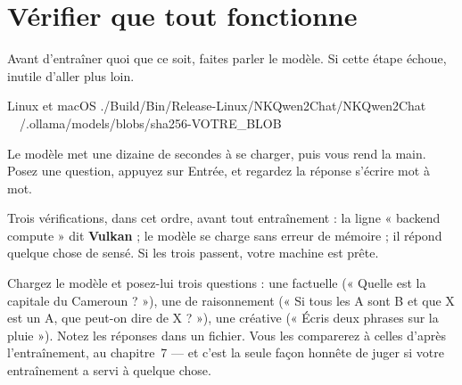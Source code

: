 \section{Vérifier que tout fonctionne}

Avant d'entraîner quoi que ce soit, faites parler le modèle. Si cette étape
échoue, inutile d'aller plus loin.


\begin{nkcode}[]{Linux et macOS}
./Build/Bin/Release-Linux/NKQwen2Chat/NKQwen2Chat \
  ~/.ollama/models/blobs/sha256-VOTRE_BLOB
\end{nkcode}

Le modèle met une dizaine de secondes à se charger, puis vous rend la main.
Posez une question, appuyez sur Entrée, et regardez la réponse s'écrire mot à
mot.

\begin{nkretenir}
Trois vérifications, dans cet ordre, avant tout entraînement : la ligne
« backend compute » dit \textbf{Vulkan} ; le modèle se charge sans erreur de
mémoire ; il répond quelque chose de sensé. Si les trois passent, votre machine
est prête.
\end{nkretenir}

\begin{nkexo}
Chargez le modèle et posez-lui trois questions : une factuelle (« Quelle est la
capitale du Cameroun ? »), une de raisonnement (« Si tous les A sont B et que
X est un A, que peut-on dire de X ? »), une créative (« Écris deux phrases sur
la pluie »). Notez les réponses dans un fichier. Vous les comparerez à celles
d'après l'entraînement, au chapitre~7 — et c'est la seule façon honnête de
juger si votre entraînement a servi à quelque chose.
\end{nkexo}
